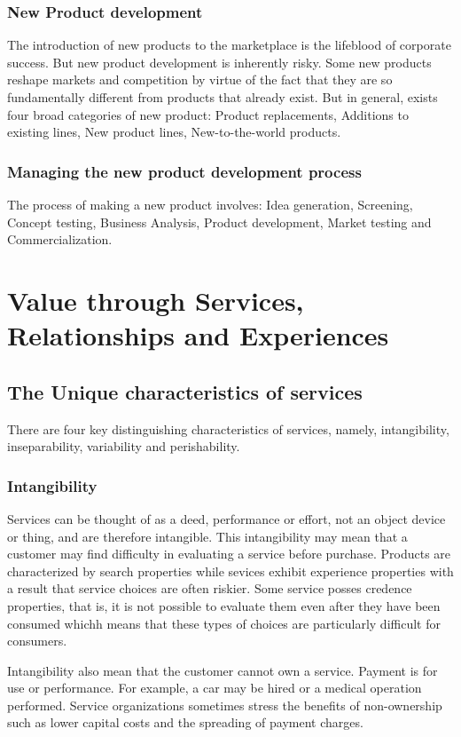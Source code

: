 \documentclass{article}
\begin{document}
\subsubsection{New Product development}
The introduction of new products to the marketplace is the lifeblood of corporate success. But new product development is inherently risky. Some new products reshape markets and competition by virtue of the fact that they are so fundamentally different from products that already exist. But in general, exists four broad categories of new product: Product replacements, Additions to existing lines, New product lines, New-to-the-world products. 

\subsubsection{Managing the new product development process}
The process of making a new product involves: Idea generation, Screening, Concept testing, Business Analysis, Product development, Market testing and Commercialization.

\section{Value through Services, Relationships and Experiences}

\subsection{The Unique characteristics of services}
There are four key distinguishing characteristics of services, namely, intangibility, inseparability, variability and perishability. 

\subsubsection*{Intangibility} 
Services can be thought of as a deed, performance or effort, not an object device or thing, and are therefore intangible. This intangibility may mean that a customer may find difficulty in evaluating a service before purchase. Products are characterized by search properties while sevices exhibit experience properties with a result that service choices are often riskier. Some service posses credence properties, that is, it is not possible to evaluate them even after they have been consumed whichh means that these types of choices are particularly difficult for consumers.

Intangibility also mean that the customer cannot own a service. Payment is for use or performance. For example, a car may be hired or a medical operation performed. Service organizations sometimes stress the benefits of non-ownership such as lower capital costs and the spreading of payment charges.
\end{document}
